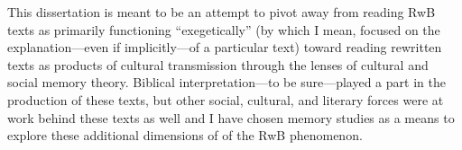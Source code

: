 This dissertation is meant to be an attempt to pivot away from reading
RwB texts as primarily functioning ``exegetically'' (by which I mean,
focused on the explanation---even if implicitly---of a particular text)
toward reading rewritten texts as products of cultural transmission
through the lenses of cultural and social memory theory. Biblical
interpretation---to be sure---played a part in the production of these
texts, but other social, cultural, and literary forces were at work
behind these texts as well and I have chosen memory studies as a means
to explore these additional dimensions of of the RwB phenomenon.
